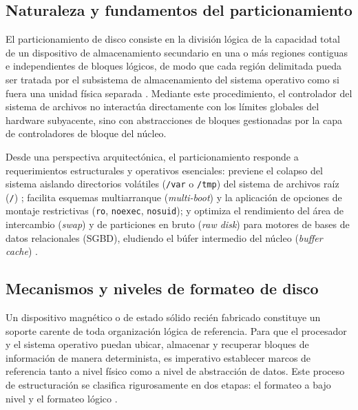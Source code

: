 \documentclass[12pt]{article}
\begin{document}
\subsection{Naturaleza y fundamentos del particionamiento}
\label{subsec:fundamentosParticionamiento}

El particionamiento de disco consiste en la división lógica de la capacidad total de un dispositivo de almacenamiento secundario en una o más regiones contiguas e independientes de bloques lógicos, de modo que cada región delimitada pueda ser tratada por el subsistema de almacenamiento del sistema operativo como si fuera una unidad física separada \parencite[\S 12.5.1, p.\ 418]{silberschatz2006fundamentos}. Mediante este procedimiento, el controlador del sistema de archivos no interactúa directamente con los límites globales del hardware subyacente, sino con abstracciones de bloques gestionadas por la capa de controladores de bloque del núcleo.

Desde una perspectiva arquitectónica, el particionamiento responde a requerimientos estructurales y operativos esenciales: previene el colapso del sistema aislando directorios volátiles (\texttt{/var} o \texttt{/tmp}) del sistema de archivos raíz (\texttt{/}) \parencite[\S 11.2, p.\ 345]{silberschatz2006fundamentos}; facilita esquemas multiarranque (\textit{multi-boot}) y la aplicación de opciones de montaje restrictivas (\texttt{ro}, \texttt{noexec}, \texttt{nosuid}); y optimiza el rendimiento del área de intercambio (\textit{swap}) y de particiones en bruto (\textit{raw disk}) para motores de bases de datos relacionales (SGBD), eludiendo el búfer intermedio del núcleo (\textit{buffer cache}) \parencite[\S 12.5.1, p.\ 419]{silberschatz2006fundamentos}.

\subsection{Mecanismos y niveles de formateo de disco}
\label{subsec:mecanismosFormateo}

Un dispositivo magnético o de estado sólido recién fabricado constituye un soporte carente de toda organización lógica de referencia. Para que el procesador y el sistema operativo puedan ubicar, almacenar y recuperar bloques de información de manera determinista, es imperativo establecer marcos de referencia tanto a nivel físico como a nivel de abstracción de datos. Este proceso de estructuración se clasifica rigurosamente en dos etapas: el formateo a bajo nivel y el formateo lógico \parencite[\S 12.5.1, p.\ 418]{silberschatz2006fundamentos}.
\end{document}
